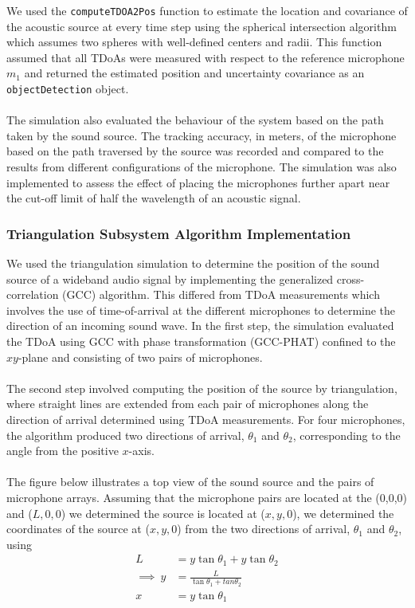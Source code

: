 \documentclass[a4paper,11pt]{article}
\begin{document}
We used the \texttt{computeTDOA2Pos} function to estimate the location and covariance of the acoustic source at every time step using the spherical intersection algorithm which assumes two spheres with well-defined centers and radii. This function assumed that all TDoAs were measured with respect to the reference microphone $m_1$ and returned the estimated position and uncertainty covariance as an \texttt{objectDetection} object.\\\\
The simulation also evaluated the behaviour of the system based on the path taken by the sound source. The tracking accuracy, in meters, of the microphone based on the path traversed by the source was recorded and compared to the results from different configurations of the microphone. The simulation was also implemented to assess the effect of placing the microphones further apart near the cut-off limit of half the wavelength of an acoustic signal.

\subsubsection{Triangulation Subsystem Algorithm Implementation}

We used the triangulation simulation to determine the position of the sound source of a wideband audio signal by implementing the generalized cross-correlation (GCC) algorithm. This differed from TDoA measurements which involves the use of time-of-arrival at the different microphones to determine the direction of an incoming sound wave. In the first step, the simulation evaluated the TDoA using GCC with phase transformation (GCC-PHAT) confined to the $xy$-plane and consisting of two pairs of microphones.\\\\ The second step involved computing the position of the source by triangulation, where straight lines are extended from each pair of microphones along the direction of arrival determined using TDoA measurements. For four microphones, the algorithm produced two directions of arrival, $\theta_1$ and $\theta_2$, corresponding to the angle from the positive $x$-axis. \\\\
The figure below illustrates a top view of the sound source and the pairs of microphone arrays. Assuming that the microphone pairs are located at the (0,0,0) and ($L,0,0$) we determined the source is located at ($x , y,0$), we determined the coordinates of the source at ($x, y, 0$) from the two directions of arrival, $\theta_1$ and $\theta_2$, using  
\begin{align} 
	L	& = y\tan\theta_1 + y\tan\theta_2\nonumber\\ 
	\implies~y	& =\frac{L}{\tan\theta_1 + tan\theta_2}\\ 
	x	& = y\tan\theta_1 
\end{align} 
\end{document}
